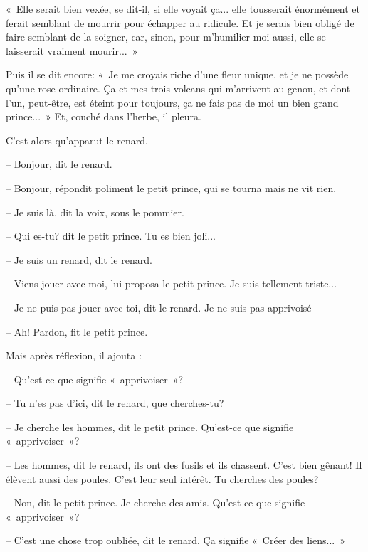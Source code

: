 \documentclass[a4paper]{report}
\begin{document}

«~Elle serait bien vexée, se dit-il, si elle voyait ça... elle tousserait énormément et ferait semblant de mourrir pour échapper au ridicule. Et je serais bien obligé de faire semblant de la soigner, car, sinon, pour m'humilier moi aussi, elle se laisserait vraiment mourir...~»

Puis il se dit encore: «~Je me croyais riche d'une fleur unique, et je ne possède qu'une rose ordinaire. Ça et mes trois volcans qui m'arrivent au genou, et dont l'un, peut-être, est éteint pour toujours, ça ne fais pas de moi un bien grand prince...~» Et, couché dans l'herbe, il pleura. 


\parachapter[XXI]{} %
C'est alors qu'apparut le renard.

-- Bonjour, dit le renard.

-- Bonjour, répondit poliment le petit prince, qui se tourna mais ne vit rien.

-- Je suis là, dit la voix, sous le pommier.

-- Qui es-tu? dit le petit prince. Tu es bien joli...


-- Je suis un renard, dit le renard.

-- Viens jouer avec moi, lui proposa le petit prince. Je suis tellement triste...

-- Je ne puis pas jouer avec toi, dit le renard. Je ne suis pas apprivoisé

-- Ah! Pardon, fit le petit prince.

Mais après réflexion, il ajouta :

-- Qu'est-ce que signifie «~apprivoiser~»?

-- Tu n'es pas d'ici, dit le renard, que cherches-tu?

-- Je cherche les hommes, dit le petit prince. Qu'est-ce que signifie «~apprivoiser~»?

-- Les hommes, dit le renard, ils ont des fusils et ils chassent. C'est bien gênant! Il élèvent aussi des poules. C'est leur seul intérêt. Tu cherches des poules?

-- Non, dit le petit prince. Je cherche des amis. Qu'est-ce que signifie «~apprivoiser~»?

-- C'est une chose trop oubliée, dit le renard. Ça signifie «~Créer des liens...~»
\end{document}
